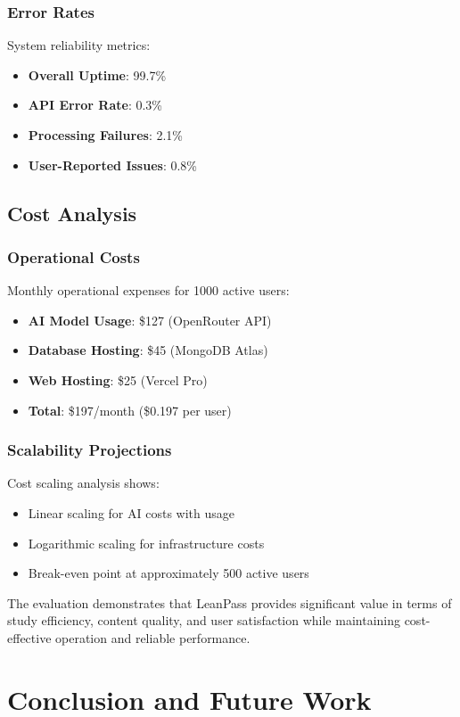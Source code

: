 \documentclass[conference]{IEEEtran}
\begin{document}
\subsubsection{Error Rates}
System reliability metrics:
\begin{itemize}
\item \textbf{Overall Uptime}: 99.7\%
\item \textbf{API Error Rate}: 0.3\%
\item \textbf{Processing Failures}: 2.1\%
\item \textbf{User-Reported Issues}: 0.8\%
\end{itemize}

\subsection{Cost Analysis}

\subsubsection{Operational Costs}
Monthly operational expenses for 1000 active users:
\begin{itemize}
\item \textbf{AI Model Usage}: \$127 (OpenRouter API)
\item \textbf{Database Hosting}: \$45 (MongoDB Atlas)
\item \textbf{Web Hosting}: \$25 (Vercel Pro)
\item \textbf{Total}: \$197/month (\$0.197 per user)
\end{itemize}

\subsubsection{Scalability Projections}
Cost scaling analysis shows:
\begin{itemize}
\item Linear scaling for AI costs with usage
\item Logarithmic scaling for infrastructure costs
\item Break-even point at approximately 500 active users
\end{itemize}

The evaluation demonstrates that LeanPass provides significant value in terms of study efficiency, content quality, and user satisfaction while maintaining cost-effective operation and reliable performance.

\section{Conclusion and Future Work}
\end{document}
